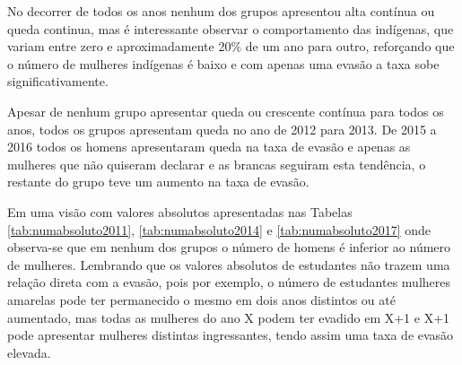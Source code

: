 No decorrer de todos os anos nenhum dos grupos apresentou alta contínua ou queda continua, mas é interessante observar o comportamento das indígenas, que variam entre zero e aproximadamente 20\% de um ano para outro, reforçando que o número de mulheres indígenas é baixo e com apenas uma evasão a taxa sobe significativamente.

Apesar de nenhum grupo apresentar queda ou crescente contínua para todos os anos, todos os grupos apresentam queda no ano de 2012 para 2013. De 2015 a 2016 todos os homens apresentaram queda na taxa de evasão e apenas as mulheres que não quiseram declarar e as brancas seguiram esta tendência, o restante do grupo teve um aumento na taxa de evasão.

Em uma visão com valores absolutos apresentadas nas Tabelas \ref{tab:numabsoluto2011}, \ref{tab:numabsoluto2014} e \ref{tab:numabsoluto2017} onde observa-se que em nenhum dos grupos o número de homens é inferior ao número de mulheres. Lembrando que os valores absolutos de estudantes não trazem uma relação direta com a evasão, pois por exemplo, o número de estudantes mulheres amarelas pode ter permanecido o mesmo em dois anos distintos ou até aumentado, mas todas as mulheres do ano X podem ter evadido em X+1 e X+1 pode apresentar mulheres distintas ingressantes, tendo assim uma taxa de evasão elevada.


